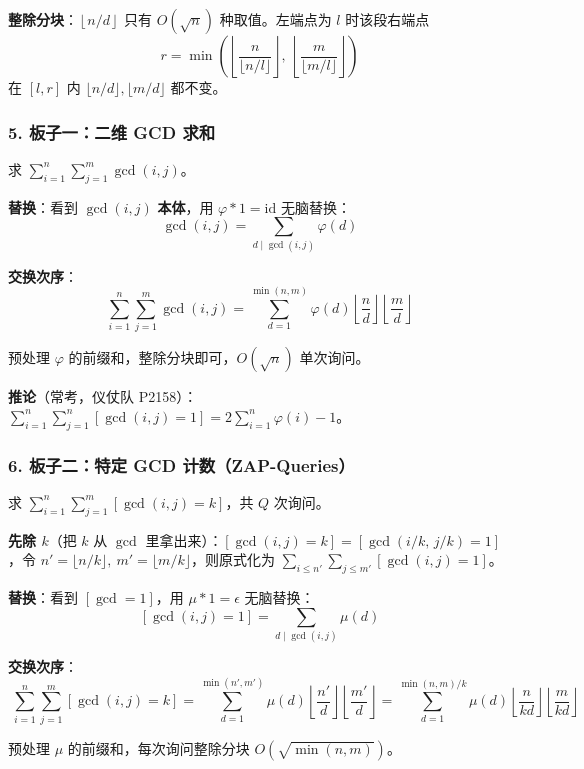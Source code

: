 \textbf{整除分块}：$\left\lfloor n/d \right\rfloor$ 只有 $O(\sqrt n)$ 种取值。左端点为 $l$ 时该段右端点
$$r = \min\left(\left\lfloor \frac{n}{\lfloor n/l \rfloor} \right\rfloor,\ \left\lfloor \frac{m}{\lfloor m/l \rfloor} \right\rfloor\right)$$
在 $[l,r]$ 内 $\lfloor n/d\rfloor, \lfloor m/d\rfloor$ 都不变。

\hrulefill

\subsubsection*{5. 板子一：二维 GCD 求和}

求 $\displaystyle\sum_{i=1}^{n}\sum_{j=1}^{m}\gcd(i,j)$。

\textbf{替换}：看到 $\gcd(i,j)$ \textbf{本体}，用 $\varphi * 1 = \mathrm{id}$ 无脑替换：
$$\gcd(i,j) = \sum_{d \mid \gcd(i,j)}\varphi(d)$$

\textbf{交换次序}：
$$\boxed{\;\sum_{i=1}^{n}\sum_{j=1}^{m}\gcd(i,j)
= \sum_{d=1}^{\min(n,m)}\varphi(d)\left\lfloor \frac nd \right\rfloor\left\lfloor \frac md \right\rfloor\;}$$

预处理 $\varphi$ 的前缀和，整除分块即可，$O(\sqrt n)$ 单次询问。

\textbf{推论}（常考，仪仗队 P2158）：$\displaystyle\sum_{i=1}^{n}\sum_{j=1}^{n}[\gcd(i,j)=1] = 2\sum_{i=1}^{n}\varphi(i) - 1$。

\hrulefill

\subsubsection*{6. 板子二：特定 GCD 计数（ZAP-Queries）}

求 $\displaystyle\sum_{i=1}^{n}\sum_{j=1}^{m}[\gcd(i,j)=k]$，共 $Q$ 次询问。

\textbf{先除 $k$}（把 $k$ 从 $\gcd$ 里拿出来）：$[\gcd(i,j)=k] = [\gcd(i/k,\,j/k)=1]$，令
$n' = \lfloor n/k \rfloor,\ m' = \lfloor m/k \rfloor$，则原式化为 $\sum_{i \le n'}\sum_{j \le m'}[\gcd(i,j)=1]$。

\textbf{替换}：看到 $[\gcd=1]$，用 $\mu * 1 = \epsilon$ 无脑替换：
$$[\gcd(i,j)=1] = \sum_{d \mid \gcd(i,j)}\mu(d)$$

\textbf{交换次序}：
$$\boxed{\;\sum_{i=1}^{n}\sum_{j=1}^{m}[\gcd(i,j)=k]
= \sum_{d=1}^{\min(n',m')}\mu(d)\left\lfloor \frac{n'}{d} \right\rfloor\left\lfloor \frac{m'}{d} \right\rfloor
= \sum_{d=1}^{\min(n,m)/k}\mu(d)\left\lfloor \frac{n}{kd} \right\rfloor\left\lfloor \frac{m}{kd} \right\rfloor\;}$$

预处理 $\mu$ 的前缀和，每次询问整除分块 $O(\sqrt{\min(n,m)})$。


